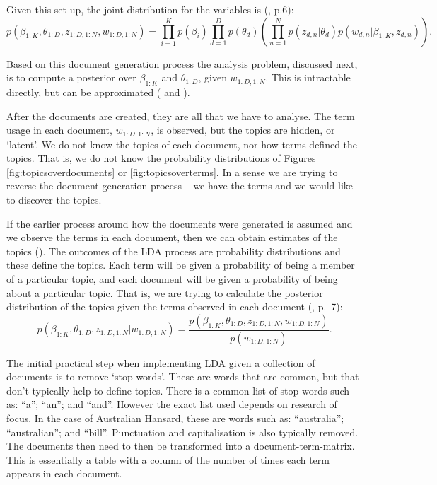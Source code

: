 \documentclass[12pt,]{article}
\theoremstyle{definition}
\theoremstyle{definition}
\theoremstyle{definition}
\theoremstyle{remark}
\begin{document}
Given this set-up, the joint distribution for the variables is
(\citet{blei2012}, p.6):
\[p(\beta_{1:K}, \theta_{1:D}, z_{1:D, 1:N}, w_{1:D, 1:N}) = \prod^{K}_{i=1}p(\beta_i) \prod^{D}_{d=1}p(\theta_d) \left(\prod^N_{n=1}p(z_{d,n}|\theta_d)p\left(w_{d,n}|\beta_{1:K},z_{d,n}\right) \right).\]

Based on this document generation process the analysis problem,
discussed next, is to compute a posterior over \(\beta_{1:K}\) and
\(\theta_{1:D}\), given \(w_{1:D, 1:N}\). This is intractable directly,
but can be approximated (\citet{GriffithsSteyvers2004} and
\citet{blei2012}).

After the documents are created, they are all that we have to analyse.
The term usage in each document, \(w_{1:D, 1:N}\), is observed, but the
topics are hidden, or `latent'. We do not know the topics of each
document, nor how terms defined the topics. That is, we do not know the
probability distributions of Figures \ref{fig:topicsoverdocuments} or
\ref{fig:topicsoverterms}. In a sense we are trying to reverse the
document generation process -- we have the terms and we would like to
discover the topics.

If the earlier process around how the documents were generated is
assumed and we observe the terms in each document, then we can obtain
estimates of the topics (\citet{SteyversGriffiths2006}). The outcomes of
the LDA process are probability distributions and these define the
topics. Each term will be given a probability of being a member of a
particular topic, and each document will be given a probability of being
about a particular topic. That is, we are trying to calculate the
posterior distribution of the topics given the terms observed in each
document (\citet{blei2012}, p.~7):
\[p(\beta_{1:K}, \theta_{1:D}, z_{1:D, 1:N} | w_{1:D, 1:N}) = \frac{p\left(\beta_{1:K}, \theta_{1:D}, z_{1:D, 1:N}, w_{1:D, 1:N}\right)}{p(w_{1:D, 1:N})}.\]

The initial practical step when implementing LDA given a collection of
documents is to remove `stop words'. These are words that are common,
but that don't typically help to define topics. There is a common list
of stop words such as: ``a''; ``an''; and ``and''. However the exact
list used depends on research of focus. In the case of Australian
Hansard, these are words such as: ``australia''; ``australian''; and
``bill''. Punctuation and capitalisation is also typically removed. The
documents then need to then be transformed into a document-term-matrix.
This is essentially a table with a column of the number of times each
term appears in each document.
\end{document}
